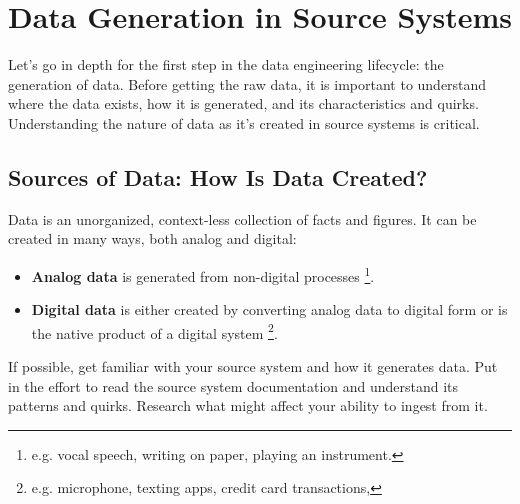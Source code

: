 \section{Data Generation in Source Systems}
Let's go in depth for the first step in the data engineering lifecycle:
the generation of data. Before getting the raw data, it is important to
understand where the data exists, how it is generated, and its
characteristics and quirks. Understanding the nature of data as it's 
created in source systems is critical.



\subsection{Sources of Data: How Is Data Created?}
Data is an unorganized, context-less collection of facts and figures.
It can be created in many ways, both analog and digital:
\begin{itemize}
    \item \textbf{Analog data} is generated from non-digital
    processes
    \footnote{
        e.g. vocal speech, writing on paper, playing an instrument.
    }.

    \item \textbf{Digital data} is either created by converting analog
    data to digital form or is the native product of a digital system
    \footnote{
        e.g. microphone, texting apps, credit card transactions, 
    }.
\end{itemize}
If possible, get familiar with your source system and how it generates
data. Put in the effort to read the source system documentation and
understand its patterns and quirks. Research what might affect your
ability to ingest from it.




